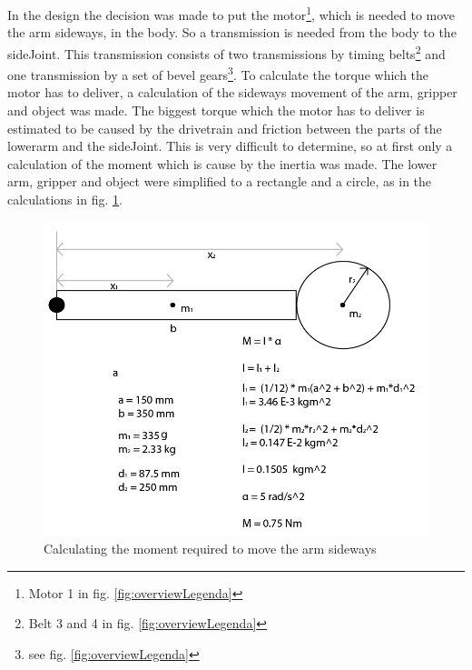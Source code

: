 \documentclass[technical_document.tex]{subfiles}
\begin{document}
In the design the decision was made to put the motor\footnote{Motor 1 in fig. \ref{fig:overviewLegenda}}, which is needed to move the arm sideways, in the body. So a transmission is needed from the body to the sideJoint. This transmission consists of two transmissions by timing belts\footnote{Belt 3 and 4 in fig. \ref{fig:overviewLegenda}} and one transmission by a set of bevel gears\footnote{see fig. \ref{fig:overviewLegenda}}. To calculate the torque which the motor has to deliver, a calculation of the sideways movement of the arm, gripper and object was made. The biggest torque which the motor has to deliver is estimated to be caused by the drivetrain and friction between the parts of the lowerarm and the sideJoint. This is very difficult to determine, so at first only a calculation of the moment which is cause by the inertia was made. The lower arm, gripper and object were simplified to a rectangle and a circle, as in the calculations in fig. \ref{fig:driveTrain_sideJoint}.

\begin{figure}[ht!]
	\centering
	\mbox{\includegraphics[scale=0.5]{Images/driveTrain_sideJoint.png}}
	\caption{Calculating the moment required to move the arm sideways}
	\label{fig:driveTrain_sideJoint}
\end{figure}
\end{document}
